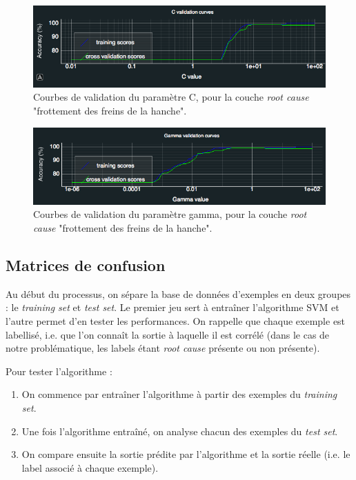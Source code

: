  \begin{figure}[h]
 	\centering\includegraphics[width=15cm]{images/courbe_validation_c.png}
 	\caption[Courbes de validation du paramètre C]{Courbes de validation du paramètre C, pour la couche \emph{root cause} "frottement des freins de la hanche".}
 	\label{fig:Courbes de validation du paramètre C}
 \end{figure}
 
  \begin{figure}[h]
  	\centering\includegraphics[width=15cm]{images/courbe_validation_gamma.png}
  	\caption[Courbes de validation du paramètre gamma]{Courbes de validation du paramètre gamma, pour la couche \emph{root cause} "frottement des freins de la hanche".}
  	\label{fig:Courbes de validation du paramètre gamma}
  \end{figure}
  
\subsection{Matrices de confusion}
\label{Industrialisation du produit: Performances de la solution:Matrices de confusion}
Au début du processus, on sépare la base de données d'exemples en deux groupes : le \emph{training set} et \emph{test set}. Le premier jeu sert à entraîner l'algorithme SVM et l'autre permet d'en tester les performances. On rappelle que chaque exemple est labellisé, i.e. que l'on connaît  la sortie à laquelle il est corrélé (dans le cas de notre problématique, les labels étant \emph{root cause} présente ou non présente).
\newline

Pour tester l'algorithme : 
\begin{enumerate}
	\item On commence par entraîner l'algorithme à partir des exemples du \emph{training set}.
	\item Une fois l'algorithme entraîné, on analyse chacun des exemples du \emph{test set}.
	\item On compare ensuite la sortie prédite par l'algorithme et la sortie réelle (i.e. le label associé à chaque exemple). 
\end{enumerate}

